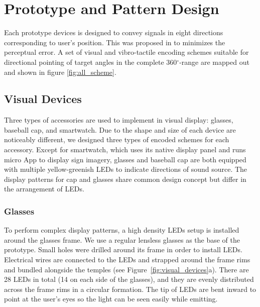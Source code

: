 \documentclass{sigchi}
\begin{document}
\section{Prototype and Pattern Design}

Each prototype devices is designed to convey signals in eight directions corresponding to user's position. This was proposed in \cite{Tessendorf2011} to minimizes the perceptual error. A set of visual and vibro-tactile encoding schemes suitable for directional pointing of target angles in the complete 360$^\circ$-range are mapped out and shown in figure \ref{fig:all_scheme}.

\subsection{Visual Devices}
Three types of accessories are used to implement in visual display: glasses, baseball cap, and smartwatch. Due to the shape and size of each device are noticeably different, we designed three types of encoded schemes for each accessory. Except for smartwatch, which uses its native display panel and runs micro App to display sign imagery, glasses and baseball cap are both equipped with multiple yellow-greenish LEDs to indicate directions of sound source. The display patterns for cap and glasses share common design concept but differ in the arrangement of LEDs. 

%


\subsubsection{Glasses}
To perform complex display patterns, a high density LEDs setup is installed around the glasses frame. We use a regular lensless glasses as the base of the prototype. Small holes were drilled around its frame in order to install LEDs. Electrical wires are connected to the LEDs and strapped around the frame rims and bundled alongside the temples (see Figure~\ref{fig:visual_devices}a). There are 28 LEDs in total (14 on each side of the glasses), and they are evenly distributed across the frame rims in a circular formation. The tip of LEDs are bent inward to point at the user's eyes so the light can be seen easily while emitting.
\end{document}
